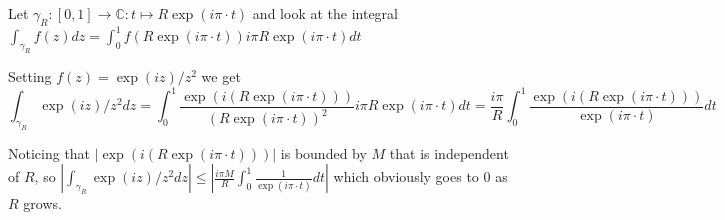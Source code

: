 \begin{cExercise}
	Let $\gamma_R:[0,1]\to\mathbb C:t\mapsto R\exp(i\pi\cdot t)$ and look at the integral $\int_{\gamma_R}f(z)dz=\int_0^1 f(R\exp(i\pi\cdot t))i\pi R\exp(i\pi\cdot t)dt$
	
	Setting $f(z)=\exp(iz)/z^2$ we get $$\int_{\gamma_R}\exp(iz)/z^2dz=\int_0^1 \frac{\exp(i(R\exp(i\pi\cdot t)))}{(R\exp(i\pi\cdot t))^2} i\pi R\exp(i\pi\cdot t)dt=\frac{i\pi}R\int_0^1 \frac{\exp(i(R\exp(i\pi\cdot t)))}{\exp(i\pi\cdot t)}dt$$
	
	Noticing that $|\exp(i(R\exp(i\pi\cdot t)))|$ is bounded by $M$ that is independent of $R$, so $\left|\int_{\gamma_R}\exp(iz)/z^2dz\right|\le \left|\frac{i\pi M}R\int_0^1 \frac{1}{\exp(i\pi\cdot t)}dt\right|$ which obviously goes to $0$ as $R$ grows.
\end{cExercise}





